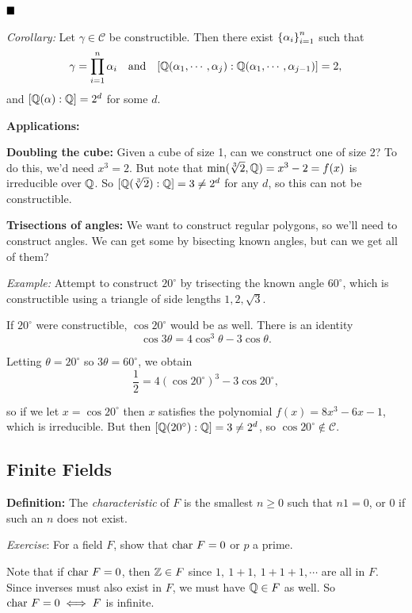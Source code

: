 \(\qed\)

\emph{Corollary:} Let \(\gamma \in \mathcal{C}\) be constructible. Then
there exist \(\left\{{\alpha_i}\right\}_{i=1}^n\) such that \[
\gamma = \prod_{i=1}^n \alpha_i
\quad\text{and}\quad
[{\mathbb{Q}}(\alpha_1, \cdots, \alpha_j): {\mathbb{Q}}(\alpha_1, \cdots, \alpha_{j-1})] = 2
,\] and \([{\mathbb{Q}}(\alpha): {\mathbb{Q}}] = 2^d\) for some \(d\).

\textbf{Applications:}

\textbf{Doubling the cube:} Given a cube of size 1, can we construct one
of size 2? To do this, we'd need \(x^3 = 2\). But note that
\(\min(\sqrt[3]{2}, {\mathbb{Q}}) = x^3 - 2 = f(x)\) is irreducible over \({\mathbb{Q}}\).
So \([{\mathbb{Q}}(\sqrt[3]{2}): {\mathbb{Q}}] = 3 \neq 2^d\) for any \(d\), so this can
not be constructible.

\textbf{Trisections of angles:} We want to construct regular polygons,
so we'll need to construct angles. We can get some by bisecting known
angles, but can we get all of them?

\emph{Example:} Attempt to construct \(20^\circ\) by trisecting the
known angle \(60^\circ\), which is constructible using a triangle of
side lengths \(1,2,\sqrt 3\).

If \(20^\circ\) were constructible, \(\cos 20^\circ\) would be as well.
There is an identity \[
\cos 3\theta = 4\cos^3 \theta - 3\cos \theta
.\]

Letting \(\theta = 20^\circ\) so \(3\theta = 60^\circ\), we obtain \[
\frac 1 2 = 4(\cos 20^\circ)^3 - 3\cos 20^\circ,
\]

so if we let \(x = \cos 20^\circ\) then \(x\) satisfies the polynomial
\(f(x) = 8x^3 - 6x - 1\), which is irreducible. But then
\([{\mathbb{Q}}(20^\circ):{\mathbb{Q}}] = 3 \neq 2^d\), so
\(\cos 20^\circ \not\in\mathcal C\).

\hypertarget{finite-fields}{%
\subsection{Finite Fields}\label{finite-fields}}

\textbf{Definition:} The \emph{characteristic} of \(F\) is the smallest
\(n\geq 0\) such that \(n1 = 0\), or \(0\) if such an \(n\) does not
exist.

\emph{Exercise}: For a field \(F\), show that \(\mathrm{char}~ F = 0\) or \(p\) a
prime.

Note that if \(\mathrm{char}~ F = 0\), then \({\mathbb{Z}} \in F\) since
\(1,~ 1+1,~ 1+1+1, \cdots\) are all in \(F\). Since inverses must also
exist in \(F\), we must have \({\mathbb{Q}} \in F\) as well. So
\(\mathrm{char}~ F = 0 \iff F\) is infinite.

